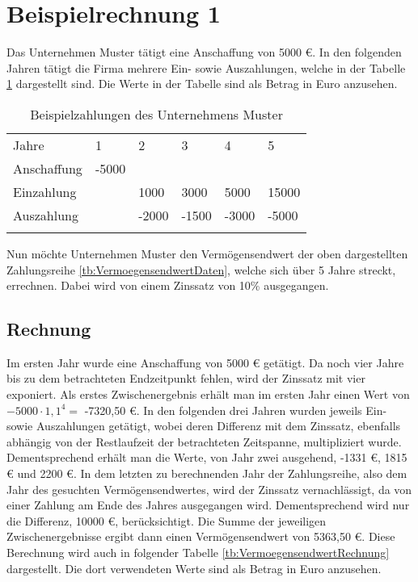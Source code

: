\section{Beispielrechnung 1}

Das Unternehmen Muster tätigt eine Anschaffung von 5000 €. In den folgenden Jahren tätigt die Firma mehrere Ein- sowie Auszahlungen, welche in der Tabelle \ref{tb:VermoegensendwertDaten} dargestellt sind. Die Werte in der Tabelle sind als Betrag in Euro anzusehen.

\bigskip

\begin{table}[!h]
    \begin{tabular}{llllll}
        \cline{1-6} \rowcolor{gray}
        Jahre       & 1     & 2     & 3     & 4     & 5     \\ \cline{1-6} \rowcolor{white}
        Anschaffung & -5000 &       &       &       &       \\ \cline{1-6} \rowcolor{white}
        Einzahlung  &       & 1000  & 3000  & 5000  & 15000 \\ \cline{1-6} \rowcolor{white}
        Auszahlung  &       & -2000 & -1500 & -3000 & -5000 \\ \cline{1-6} \rowcolor{white}
    \end{tabular}
    \caption{Beispielzahlungen des Unternehmens Muster}
    \label{tb:VermoegensendwertDaten}
\end{table}

\bigskip
\noindent
Nun möchte Unternehmen Muster den Vermögensendwert der oben dargestellten Zahlungsreihe \eqref{tb:VermoegensendwertDaten}, welche sich über 5 Jahre streckt, errechnen. Dabei wird von einem Zinssatz von 10\% ausgegangen.
\subsection{Rechnung}

Im ersten Jahr wurde eine Anschaffung von 5000 € getätigt. Da noch vier Jahre bis zu dem betrachteten Endzeitpunkt fehlen, wird der Zinssatz mit vier exponiert. Als erstes Zwischenergebnis erhält man im ersten Jahr einen Wert von $-5000 \cdot 1,1^4 =$ -7320,50 €. In den folgenden drei Jahren wurden jeweils Ein- sowie Auszahlungen getätigt, wobei deren Differenz mit dem Zinssatz, ebenfalls abhängig von der Restlaufzeit der betrachteten Zeitspanne, multipliziert wurde. Dementsprechend erhält man die Werte, von Jahr zwei ausgehend, -1331 €, 1815 € und 2200 €. In dem letzten zu berechnenden Jahr der Zahlungsreihe, also dem Jahr des gesuchten Vermögensendwertes, wird der Zinssatz vernachlässigt, da von einer Zahlung am Ende des Jahres ausgegangen wird. Dementsprechend wird nur die Differenz, 10000 €, berücksichtigt. Die Summe der jeweiligen Zwischenergebnisse ergibt dann einen Vermögensendwert von 5363,50 €. Diese Berechnung wird auch in folgender Tabelle \ref{tb:VermoegensendwertRechnung} dargestellt. Die dort verwendeten Werte sind als Betrag in Euro anzusehen.

